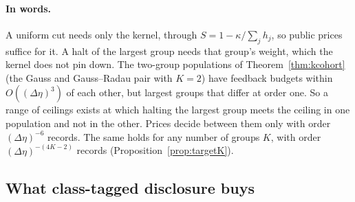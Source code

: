 \documentclass[12pt]{article}
\theoremstyle{definition}
\theoremstyle{remark}
\begin{document}
\paragraph{In words.} A uniform cut needs only the kernel, through $S=1-\kappa/\sum_jh_j$, so public prices suffice for it. A halt of the largest group needs that group's weight, which the kernel does not pin down. The two-group populations of Theorem~\ref{thm:kcohort} (the Gauss and Gauss--Radau pair with $K=2$) have feedback budgets within $O((\Delta\eta)^3)$ of each other, but largest groups that differ at order one. So a range of ceilings exists at which halting the largest group meets the ceiling in one population and not in the other. Prices decide between them only with order $(\Delta\eta)^{-6}$ records. The same holds for any number of groups $K$, with order $(\Delta\eta)^{-(4K-2)}$ records (Proposition~\ref{prop:targetK}).

\subsection{What class-tagged disclosure buys}
\end{document}
